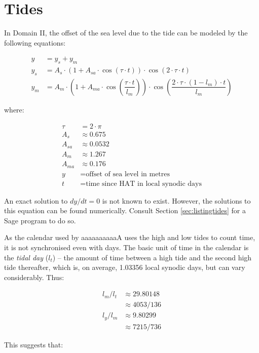 \documentclass{book}
\newcommand{\lname}{aaaaaaaaaaA}
\begin{document}
\section{Tides}

In Domain II, the offset of the sea level due to the tide can be modeled by the following equations:

\begin{align}
    y &= y_s + y_m \\
    y_s &= A_s \cdot \left(1 + A_{sa} \cdot \cos(\tau \cdot t)\right) \cdot \cos(2 \cdot \tau \cdot t) \\
    y_m &= A_m \cdot \left(1 + A_{ma} \cdot \cos\left(\dfrac{\tau \cdot t}{l_m}\right)\right) \cdot \cos\left(\dfrac{2 \cdot \tau \cdot (1 - l_m) \cdot t}{l_m}\right)
\end{align}

where:

\begin{align*}
    \tau &= 2 \cdot \pi \\
    A_s &\approx 0.675 \\
    A_{sa} &\approx 0.0532 \\
    A_m &\approx 1.267 \\
    A_{ma} &\approx 0.176 \\
    y &= \text{offset of sea level in metres} \\
    t &= \text{time since HAT in local synodic days}
\end{align*}

An exact solution to $dy/dt = 0$ is not known to exist. However, the solutions to this equation can be found numerically. Consult Section \ref{sec:listingtides} for a Sage program to do so.

As the calendar used by \lname{} uses the high and low tides to count time, it is not synchronised even with days. The basic unit of time in the calendar is the \emph{tidal day}  ($l_t$) -- the amount of time between a high tide and the second high tide thereafter, which is, on average, 1.03356 local synodic days, but can vary considerably. Thus:

\begin{align}
    l_m / l_t &\approx 29.80148 \\
    &\approx 4053/136 \\
    l_y / l_m &\approx 9.80299 \\
    &\approx 7215/736
\end{align}

This suggests that:
\end{document}
